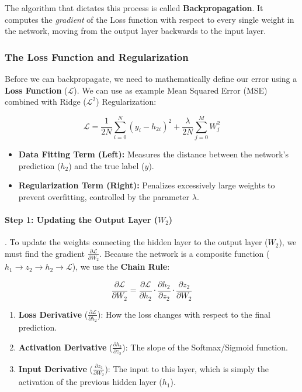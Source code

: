\documentclass[11pt]{article}
\theoremstyle{smallexample}
\begin{document}
The algorithm that dictates this process is called \textbf{Backpropagation}. It computes the \textit{gradient} of the Loss function with respect to every single weight in the network, moving from the output layer backwards to the input layer.

\subsubsection{The Loss Function and Regularization}
Before we can backpropagate, we need to mathematically define our error using a \textbf{Loss Function} ($\mathcal{L}$). We can use as example Mean Squared Error (MSE) combined with Ridge ($\mathcal{L}^2$) Regularization:

\[
\mathcal{L} = \frac{1}{2N}\sum_{i=0}^{N}(y_i - h_{2i})^2 + \frac{\lambda}{2N}\sum_{j=0}^{M} W_j^2
\]

\begin{itemize}
    \item \textbf{Data Fitting Term (Left):} Measures the distance between the network's prediction ($h_2$) and the true label ($y$).
    \item \textbf{Regularization Term (Right):} Penalizes excessively large weights to prevent overfitting, controlled by the parameter $\lambda$.
\end{itemize}

\paragraph*{Step 1: Updating the Output Layer ($W_2$)}.
To update the weights connecting the hidden layer to the output layer ($W_2$), we must find the gradient $\frac{\partial \mathcal{L}}{\partial W_2}$. Because the network is a composite function ($h_1 \rightarrow z_2 \rightarrow h_2 \rightarrow \mathcal{L}$), we use the \textbf{Chain Rule}:

\[
\frac{\partial \mathcal{L}}{\partial W_2} = \frac{\partial \mathcal{L}}{\partial h_2} \cdot \frac{\partial h_2}{\partial z_2} \cdot \frac{\partial z_2}{\partial W_2}
\]

\begin{enumerate}
    \item \textbf{Loss Derivative} ($\frac{\partial \mathcal{L}}{\partial h_2}$): How the loss changes with respect to the final prediction.
    \item \textbf{Activation Derivative} ($\frac{\partial h_2}{\partial z_2}$): The slope of the Softmax/Sigmoid function.
    \item \textbf{Input Derivative} ($\frac{\partial z_2}{\partial W_2}$): The input to this layer, which is simply the activation of the previous hidden layer ($h_1$).
\end{enumerate}
\end{document}
